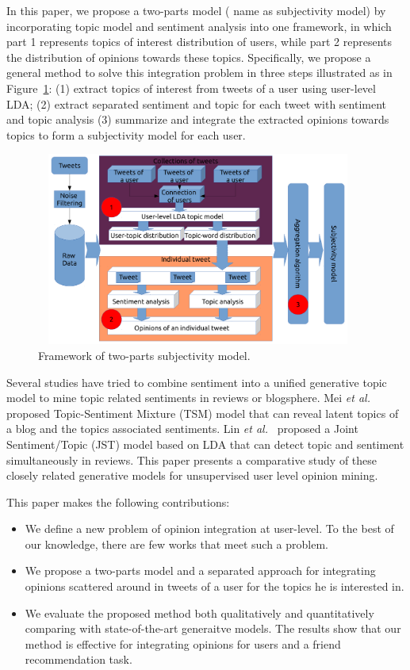 \documentclass[runningheads,a4paper]{llncs}
\begin{document}
In this paper, we propose a two-parts model ( name as subjectivity model) by incorporating topic model and sentiment analysis into one framework, in which part 1 represents topics of interest distribution of users, while part 2 represents the distribution of opinions towards these topics. Specifically, we propose a general method to solve this integration problem in three steps illustrated as in Figure~\ref{fig1}: (1) extract topics of interest from tweets of a user using user-level LDA; (2) extract separated sentiment and topic for each tweet with sentiment and topic analysis  (3) summarize and integrate the extracted opinions towards topics to form a subjectivity model for each user.
\begin{figure}[htb]
\centering
\includegraphics[width=4.2in,height=2.5in]{procedure.pdf}
\caption{Framework of two-parts subjectivity model.}
\label{fig1}
\end{figure}

Several studies have tried to combine sentiment into a unified generative topic model to mine topic related sentiments in reviews or blogsphere. Mei \emph{et al.}~\cite{mei2007topic} proposed Topic-Sentiment Mixture (TSM) model that can reveal latent topics of a blog and the topics associated sentiments. Lin \emph{et al.}~\cite{lin2009joint} proposed a Joint Sentiment/Topic (JST) model based on LDA that can detect topic and sentiment simultaneously in reviews. This paper presents a comparative study of these closely related generative models for unsupervised user level opinion mining.

This paper makes the following contributions:
\begin{itemize}
\item We define a new problem of opinion integration at user-level. To the best of our knowledge, there are few works that meet such a problem.
\item We propose a two-parts model and a separated approach for integrating opinions scattered around in tweets of a user for the topics he is interested in.
\item We evaluate the proposed method both qualitatively and quantitatively comparing with state-of-the-art generaitve models. The results show that our method is effective for integrating opinions for users and a friend recommendation task.
\end{itemize}
\end{document}

